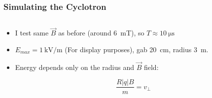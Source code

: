 \documentclass{beamer}
\begin{document}
\begin{frame}
\frametitle{Simulating the Cyclotron}
\begin{columns}
\begin{column}{0.5\linewidth}
\begin{itemize}
\item<1-> I test same $\vec{B}$ as before (around \SI{6}{\milli\tesla}), so $T\approx \SI{10}{\micro\second}$

\item<2-> $E_{max}=\SI{1}{\kilo\volt/\meter}$ (For display purposes), gab \SI{20}{\centi\meter}, radius \SI{3}{\meter}.

\item<3-> Energy depends only on the radius and $\vec{B}$ field:

\begin{equation*}
\frac{R|q|B}{m} = v_\perp
\end{equation*}



\end{itemize}
\end{column}
\end{columns}
\end{frame}
\end{document}
